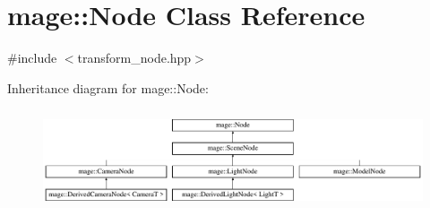 \hypertarget{classmage_1_1_node}{}\section{mage\+:\+:Node Class Reference}
\label{classmage_1_1_node}


{\ttfamily \#include $<$transform\+\_\+node.\+hpp$>$}

Inheritance diagram for mage\+:\+:Node\+:\begin{figure}[H]
\begin{center}
\leavevmode
\includegraphics[height=2.986667cm]{classmage_1_1_node}
\end{center}
\end{figure}
